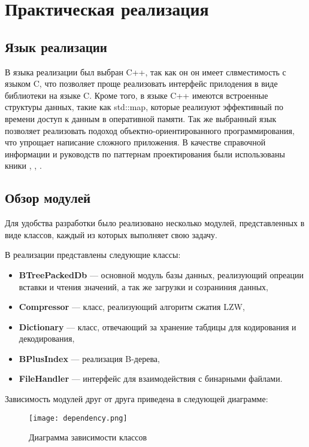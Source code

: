 \documentclass[14pt, russian]{scrartcl}
\begin{document}
\section{Практическая реализация}
\subsection{Язык реализации}
В языка реализации был выбран C++, так как он он имеет слвместимость с языком C, что позволяет проще реализовать интерфейс прилодения в виде библиотеки на языке C. Кроме того, в языке C++ имеются встроенные структуры данных, такие как std::map, которые реализуют эффективный по времени доступ к данным в оперативной памяти. Так же выбранный язык позволяет реализовать подоход объектно-ориентированного программирования, что упрощает написание сложного приложения. В качестве справочной информации и руководств по паттернам проектирования были использованы кники \cite{gamma}, \cite{pikus}, \cite{deitel_c}.

\subsection{Обзор модулей}
Для удобства разработки было реализовано несколько модулей, представленных в виде классов, каждый из которых выполняет свою задачу.

В реализации представлены следующие классы:

\begin{itemize}
    \item \textbf{BTreePackedDb} --- основной модуль базы данных, реализующий опреации вставки и чтения значений, а так же загрузки и созраниния данных,
    \item \textbf{Compressor} --- класс, реализующий алгоритм сжатия LZW,
    \item \textbf{Dictionary} --- класс, отвечающий за хранение табдицы для кодирования и декодирования,
    \item \textbf{BPlusIndex} --- реализация B-дерева,
    \item \textbf{FileHandler} --- интерфейс для взаимодействия с бинарными файлами.
\end{itemize}

Зависимость модулей друг от друга приведена в следующей диаграмме:

\vspace{20pt}
\begin{figure}[H]\centering
\texttt{[image: dependency.png]}
\caption{Диаграмма зависимости классов}
\label{fig::thesis}
\end{figure}
\end{document}
